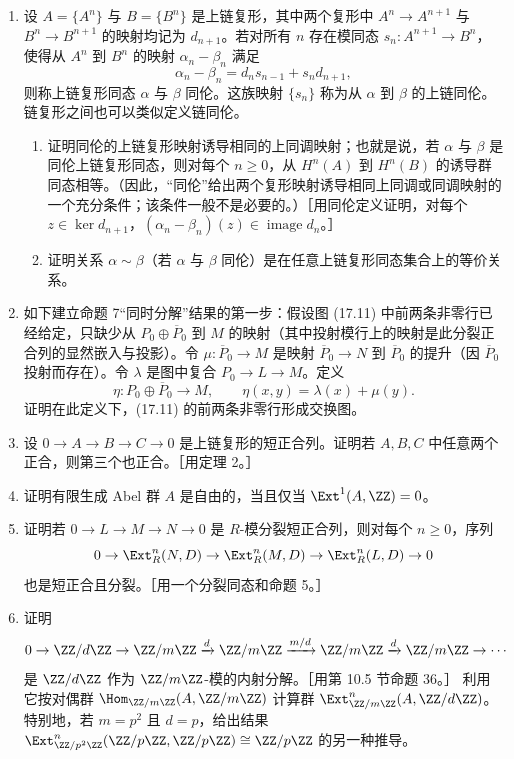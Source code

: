 \begin{enumerate}[label=\arabic*.]
  \item 设 $A=\{A^n\}$ 与 $B=\{B^n\}$ 是上链复形，其中两个复形中 $A^n\to A^{n+1}$ 与 $B^n\to B^{n+1}$ 的映射均记为 $d_{n+1}$。若对所有 $n$ 存在模同态 $s_n:A^{n+1}\to B^n$，使得从 $A^n$ 到 $B^n$ 的映射 $\alpha_n-\beta_n$ 满足
  \[
    \alpha_n-\beta_n=d_ns_{n-1}+s_nd_{n+1},
  \]
  则称上链复形同态 $\alpha$ 与 $\beta$ 同伦。这族映射 $\{s_n\}$ 称为从 $\alpha$ 到 $\beta$ 的上链同伦。链复形之间也可以类似定义链同伦。
  \begin{enumerate}[label=(\alph*)]
    \item 证明同伦的上链复形映射诱导相同的上同调映射；也就是说，若 $\alpha$ 与 $\beta$ 是同伦上链复形同态，则对每个 $n\geq0$，从 $H^n(A)$ 到 $H^n(B)$ 的诱导群同态相等。（因此，“同伦”给出两个复形映射诱导相同上同调或同调映射的一个充分条件；该条件一般不是必要的。）［用同伦定义证明，对每个 $z\in\ker d_{n+1}$，$(\alpha_n-\beta_n)(z)\in\operatorname{image}d_n$。］
    \item 证明关系 $\alpha\sim\beta$（若 $\alpha$ 与 $\beta$ 同伦）是在任意上链复形同态集合上的等价关系。
  \end{enumerate}

  \item 如下建立命题 7“同时分解”结果的第一步：假设图 (17.11) 中前两条非零行已经给定，只缺少从 $P_0\oplus\overline P_0$ 到 $M$ 的映射（其中投射模行上的映射是此分裂正合列的显然嵌入与投影）。令 $\mu:\overline P_0\to M$ 是映射 $\overline P_0\to N$ 到 $\overline P_0$ 的提升（因 $\overline P_0$ 投射而存在）。令 $\lambda$ 是图中复合 $P_0\to L\to M$。定义
  \[
    \eta:P_0\oplus\overline P_0\to M,\qquad \eta(x,y)=\lambda(x)+\mu(y).
  \]
  证明在此定义下，(17.11) 的前两条非零行形成交换图。

  \item 设 $0\to A\to B\to C\to0$ 是上链复形的短正合列。证明若 $A,B,C$ 中任意两个正合，则第三个也正合。［用定理 2。］

  \item 证明有限生成 Abel 群 $A$ 是自由的，当且仅当 $\Ext^1(A,\ZZ)=0$。

  \item 证明若 $0\to L\to M\to N\to0$ 是 $R$-模分裂短正合列，则对每个 $n\geq0$，序列
  \[
    0\to\Ext_R^n(N,D)\to\Ext_R^n(M,D)\to\Ext_R^n(L,D)\to0
  \]
  也是短正合且分裂。［用一个分裂同态和命题 5。］

  \item 证明
  \[
    0\to\ZZ/d\ZZ\to\ZZ/m\ZZ\xrightarrow{d}\ZZ/m\ZZ\xrightarrow{m/d}\ZZ/m\ZZ\xrightarrow{d}\ZZ/m\ZZ\to\cdots
  \]
  是 $\ZZ/d\ZZ$ 作为 $\ZZ/m\ZZ$-模的内射分解。［用第 10.5 节命题 36。］
  利用它按对偶群 $\Hom_{\ZZ/m\ZZ}(A,\ZZ/m\ZZ)$ 计算群 $\Ext_{\ZZ/m\ZZ}^n(A,\ZZ/d\ZZ)$。特别地，若 $m=p^2$ 且 $d=p$，给出结果 $\Ext_{\ZZ/p^2\ZZ}^n(\ZZ/p\ZZ,\ZZ/p\ZZ)\cong\ZZ/p\ZZ$ 的另一种推导。


\end{enumerate}
